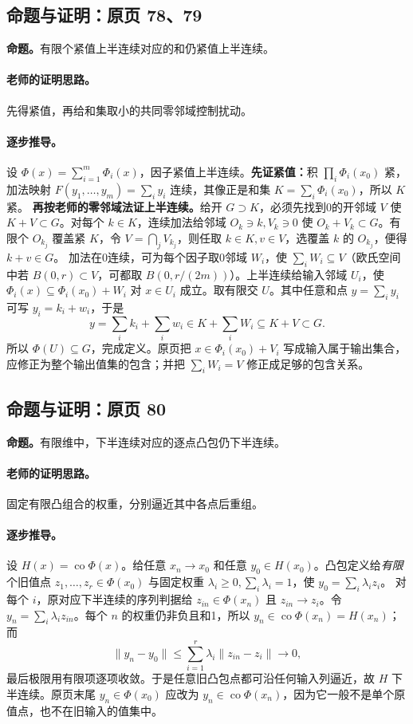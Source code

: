 \subsection{命题与证明：原页 78、79}

\textbf{命题。}有限个紧值上半连续对应的和仍紧值上半连续。

\paragraph{老师的证明思路。}先得紧值，再给和集取小的共同零邻域控制扰动。

\paragraph{逐步推导。}
设 $\Phi(x)=\sum_{i=1}^m\Phi_i(x)$，因子紧值上半连续。\textbf{先证紧值：}积 $\prod_i\Phi_i(x_0)$ 紧，加法映射 $F(y_1,\ldots,y_m)=\sum_iy_i$ 连续，其像正是和集 $K=\sum_i\Phi_i(x_0)$，所以 $K$ 紧。
\textbf{再按老师的零邻域法证上半连续。}给开 $G\supset K$，必须先找到0的开邻域 $V$ 使 $K+V\subset G$。对每个 $k\in K$，连续加法给邻域 $O_k\ni k,V_k\ni0$ 使 $O_k+V_k\subset G$。有限个 $O_{k_j}$ 覆盖紧 $K$，令 $V=\bigcap_jV_{k_j}$，则任取 $k\in K,v\in V$，选覆盖 $k$ 的 $O_{k_j}$，便得 $k+v\in G$。
加法在0连续，可为每个因子取0邻域 $W_i$，使 $\sum_iW_i\subseteq V$（欧氏空间中若 $B(0,r)\subset V$，可都取 $B(0,r/(2m))$）。上半连续给输入邻域 $U_i$，使 $\Phi_i(x)\subseteq\Phi_i(x_0)+W_i$ 对 $x\in U_i$ 成立。取有限交 $U$。其中任意和点 $y=\sum_iy_i$ 可写 $y_i=k_i+w_i$，于是
\[y=\sum_i k_i+\sum_iw_i\in K+\sum_iW_i\subseteq K+V\subset G.\]
所以 $\Phi(U)\subseteq G$，完成定义。原页把 $x\in\Phi_i(x_0)+V_i$ 写成输入属于输出集合，应修正为整个输出值集的包含；并把 $\sum_iW_i=V$ 修正成足够的包含关系。


\subsection{命题与证明：原页 80}

\textbf{命题。}有限维中，下半连续对应的逐点凸包仍下半连续。

\paragraph{老师的证明思路。}固定有限凸组合的权重，分别逼近其中各点后重组。

\paragraph{逐步推导。}
设 $H(x)=\operatorname{co}\Phi(x)$。给任意 $x_n\to x_0$ 和任意 $y_0\in H(x_0)$。凸包定义给\emph{有限}个旧值点 $z_1,\ldots,z_r\in\Phi(x_0)$ 与固定权重 $\lambda_i\ge0,\sum_i\lambda_i=1$，使 $y_0=\sum_i\lambda_i z_i$。
对每个 $i$，原对应下半连续的序列判据给 $z_{in}\in\Phi(x_n)$ 且 $z_{in}\to z_i$。令 $y_n=\sum_i\lambda_i z_{in}$。每个 $n$ 的权重仍非负且和1，所以 $y_n\in\operatorname{co}\Phi(x_n)=H(x_n)$；而
\[\|y_n-y_0\|\le\sum_{i=1}^r\lambda_i\|z_{in}-z_i\|\to0,\]
最后极限用有限项逐项收敛。于是任意旧凸包点都可沿任何输入列逼近，故 $H$ 下半连续。原页末尾 $y_n\in\Phi(x_0)$ 应改为 $y_n\in\operatorname{co}\Phi(x_n)$，因为它一般不是单个原值点，也不在旧输入的值集中。


